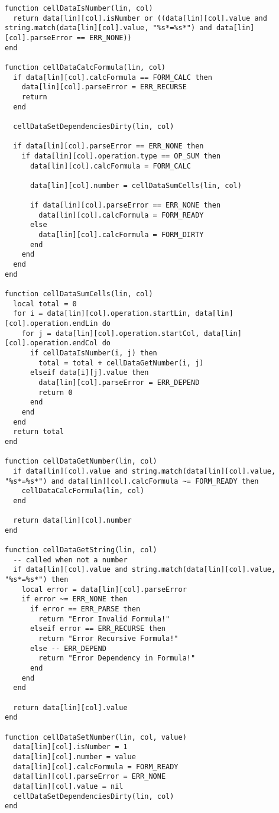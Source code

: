 \documentclass{ctexart}
\begin{document}
\begin{lstlisting}
function cellDataIsNumber(lin, col)
  return data[lin][col].isNumber or ((data[lin][col].value and string.match(data[lin][col].value, "%s*=%s*") and data[lin][col].parseError == ERR_NONE))
end

function cellDataCalcFormula(lin, col)
  if data[lin][col].calcFormula == FORM_CALC then
    data[lin][col].parseError = ERR_RECURSE
    return
  end

  cellDataSetDependenciesDirty(lin, col)

  if data[lin][col].parseError == ERR_NONE then
    if data[lin][col].operation.type == OP_SUM then
      data[lin][col].calcFormula = FORM_CALC

      data[lin][col].number = cellDataSumCells(lin, col)

      if data[lin][col].parseError == ERR_NONE then
        data[lin][col].calcFormula = FORM_READY
      else
        data[lin][col].calcFormula = FORM_DIRTY
      end
    end
  end
end

function cellDataSumCells(lin, col)
  local total = 0
  for i = data[lin][col].operation.startLin, data[lin][col].operation.endLin do
    for j = data[lin][col].operation.startCol, data[lin][col].operation.endCol do
      if cellDataIsNumber(i, j) then
        total = total + cellDataGetNumber(i, j)
      elseif data[i][j].value then
        data[lin][col].parseError = ERR_DEPEND
        return 0
      end
    end
  end
  return total
end

function cellDataGetNumber(lin, col)
  if data[lin][col].value and string.match(data[lin][col].value, "%s*=%s*") and data[lin][col].calcFormula ~= FORM_READY then
    cellDataCalcFormula(lin, col)
  end

  return data[lin][col].number
end

function cellDataGetString(lin, col)
  -- called when not a number
  if data[lin][col].value and string.match(data[lin][col].value, "%s*=%s*") then
    local error = data[lin][col].parseError
    if error ~= ERR_NONE then
      if error == ERR_PARSE then
        return "Error Invalid Formula!"
      elseif error == ERR_RECURSE then
        return "Error Recursive Formula!"
      else -- ERR_DEPEND
        return "Error Dependency in Formula!"
      end
    end
  end

  return data[lin][col].value
end

function cellDataSetNumber(lin, col, value)
  data[lin][col].isNumber = 1
  data[lin][col].number = value
  data[lin][col].calcFormula = FORM_READY
  data[lin][col].parseError = ERR_NONE
  data[lin][col].value = nil
  cellDataSetDependenciesDirty(lin, col)
end


\end{lstlisting}
\end{document}
